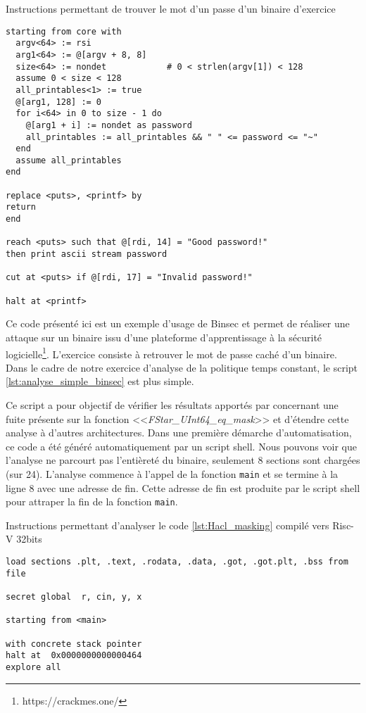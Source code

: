 \begin{listing}[!ht]
    \caption{Instructions permettant de trouver le mot d'un passe d'un binaire d'exercice}
    \label{lst:exemple_binsec}
    \begin{verbatim}
starting from core with
  argv<64> := rsi
  arg1<64> := @[argv + 8, 8]
  size<64> := nondet            # 0 < strlen(argv[1]) < 128
  assume 0 < size < 128
  all_printables<1> := true
  @[arg1, 128] := 0
  for i<64> in 0 to size - 1 do
    @[arg1 + i] := nondet as password
    all_printables := all_printables && " " <= password <= "~"
  end
  assume all_printables
end

replace <puts>, <printf> by
return
end

reach <puts> such that @[rdi, 14] = "Good password!"
then print ascii stream password

cut at <puts> if @[rdi, 17] = "Invalid password!"

halt at <printf>
\end{verbatim}
\end{listing}

Ce code présenté ici est un exemple d'usage de Binsec et permet de réaliser une attaque sur un binaire issu d'une plateforme d'apprentissage à la sécurité logicielle\footnote{https://crackmes.one/}. L'exercice consiste à retrouver le mot de passe caché d'un binaire. Dans le cadre de notre exercice d'analyse de la politique temps constant, le script \ref{lst:analyse_simple_binsec} est plus simple.\medbreak

Ce script a pour objectif de vérifier les résultats apportés par \cite{schneider2024breakingbadcompilersbreak} concernant une fuite présente sur la fonction <<\textit{FStar\_UInt64\_eq\_mask}>> et d'étendre cette analyse à d'autres architectures. Dans une première démarche d'automatisation, ce code a été généré automatiquement par un script shell. Nous pouvons voir que l'analyse ne parcourt pas l'entièreté du binaire, seulement 8 sections sont chargées (sur 24). L'analyse commence à l'appel de la fonction \texttt{main} et se termine à la ligne 8 avec une adresse de fin. Cette adresse de fin est produite par le script shell pour attraper la fin de la fonction \texttt{main}. 

\begin{listing}[!ht]
    \caption{Instructions permettant d'analyser le code \ref{lst:Hacl_masking} compilé vers Risc-V 32bits}
    \label{lst:analyse_simple_binsec}
    \begin{verbatim}
load sections .plt, .text, .rodata, .data, .got, .got.plt, .bss from file

secret global  r, cin, y, x

starting from <main>

with concrete stack pointer
halt at  0x0000000000000464
explore all

\end{verbatim}
\end{listing}


